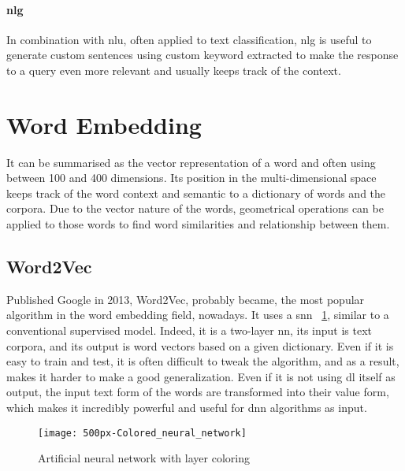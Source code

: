 \paragraph{\gls{nlg}}
In combination with \gls{nlu}, often applied to text classification, \gls{nlg} is useful to generate custom sentences using custom keyword extracted to make the response to a query even more relevant and usually keeps track of the context.


\section{Word Embedding}
It can be summarised as the vector representation of a word and often using between 100 and 400 dimensions. Its position in the multi-dimensional space keeps track of the word context and semantic to a dictionary of words and the corpora. Due to the vector nature of the words, geometrical operations can be applied to those words to find word similarities and relationship between them. 


\subsection{Word2Vec}
Published Google in 2013, Word2Vec\cite{article:word2vec}, probably became, the most popular algorithm in the word embedding field, nowadays. It uses a \gls{snn} ~\ref{fig:wikipedia_colored_neural_network_img}, similar to a conventional supervised model. Indeed, it is a two-layer \gls{nn}, its input is text corpora, and its output is word vectors based on a given dictionary. Even if it is easy to train and test, it is often difficult to tweak the algorithm, and as a result, makes it harder to make a good generalization. Even if it is not using \gls{dl} itself as output, the input text form of the words are transformed into their value form, which makes it incredibly powerful and useful for \gls{dnn} algorithms as input.

\begin{figure}[ht!]
    \centering
    \texttt{[image: 500px-Colored\_neural\_network]}
    \caption{
       Artificial neural network with layer coloring \cite{wikipedia:colored_neural_network_img}
    }
    \label{fig:wikipedia_colored_neural_network_img}
\end{figure}


